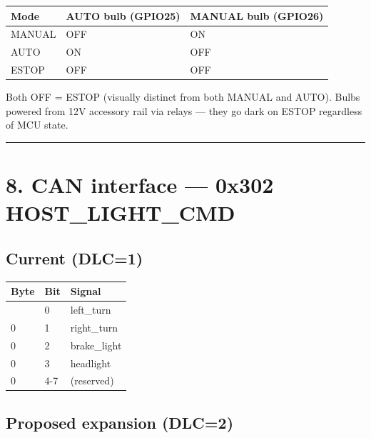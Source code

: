 \documentclass[12pt,a4paper,oneside]{report}
\begin{document}
\begin{longtable}[]{@{}lll@{}}
\toprule\noalign{}
Mode & AUTO bulb (GPIO25) & MANUAL bulb (GPIO26) \\
\midrule\noalign{}
\endhead
\bottomrule\noalign{}
\endlastfoot
MANUAL & OFF & ON \\
AUTO & ON & OFF \\
ESTOP & OFF & OFF \\
\end{longtable}

Both OFF = ESTOP (visually distinct from both MANUAL and AUTO). Bulbs powered
from 12V accessory rail via relays --- they go dark on ESTOP regardless of MCU
state.

\begin{center}\rule{0.5\linewidth}{0.5pt}\end{center}

\section{8. CAN interface --- 0x302
HOST\_LIGHT\_CMD}\label{can-interface-0x302-host_light_cmd}

\subsection{Current (DLC=1)}\label{current-dlc1}

\begin{longtable}[]{@{}lll@{}}
\toprule\noalign{}
Byte & Bit & Signal \\
\midrule\noalign{}
\endhead
\bottomrule\noalign{}
\endlastfoot
0 & 0 & left\_turn \\
0 & 1 & right\_turn \\
0 & 2 & brake\_light \\
0 & 3 & headlight \\
0 & 4-7 & (reserved) \\
\end{longtable}

\subsection{Proposed expansion (DLC=2)}\label{proposed-expansion-dlc2}
\end{document}
